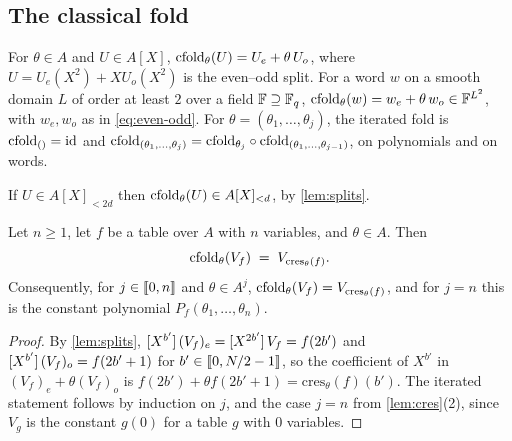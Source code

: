 \subsection{The classical fold}\label{sec:restriction:fold}

\begin{definition}\label{def:cfold}
For $\theta \in A$ and $U \in A[X]$, $\mathrm{cfold}_\theta(U) = U_e + \theta\, U_o$, where $U = U_e(X^2) + X U_o(X^2)$ is the even--odd split.
For a word $w$ on a smooth domain $L$ of order at least $2$ over a field $\mathbb{F} \supseteq \mathbb{F}_q$, $\mathrm{cfold}_\theta(w) = w_e + \theta\, w_o \in \mathbb{F}^{L^2}$, with $w_e, w_o$ as in \eqref{eq:even-odd}.
For $\theta = (\theta_1,\dots,\theta_j)$, the iterated fold is $\mathrm{cfold}_{()} = \mathrm{id}$ and $\mathrm{cfold}_{(\theta_1,\dots,\theta_j)} = \mathrm{cfold}_{\theta_j} \circ \mathrm{cfold}_{(\theta_1,\dots,\theta_{j-1})}$, on polynomials and on words.
\end{definition}

If $U \in A[X]_{<2d}$ then $\mathrm{cfold}_\theta(U) \in A[X]_{<d}$, by \cref{lem:splits}.

\begin{theorem}\label{thm:dictionary}
Let $n \ge 1$, let $f$ be a table over $A$ with $n$ variables, and $\theta \in A$. Then
\[
  \mathrm{cfold}_\theta(V_f) \;=\; V_{\mathrm{cres}_\theta(f)}.
\]
Consequently, for $j \in \llbracket 0, n \rrbracket$ and $\theta \in A^j$, $\mathrm{cfold}_\theta(V_f) = V_{\mathrm{cres}_\theta(f)}$, and for $j = n$ this is the constant polynomial $P_f(\theta_1,\dots,\theta_n)$.
\end{theorem}

\begin{proof}
By \cref{lem:splits}, $[X^{b'}]\,(V_f)_e = [X^{2b'}]\,V_f = f(2b')$ and $[X^{b'}]\,(V_f)_o = f(2b'+1)$ for $b' \in \llbracket 0, N/2-1 \rrbracket$, so the coefficient of $X^{b'}$ in $(V_f)_e + \theta (V_f)_o$ is $f(2b') + \theta f(2b'+1) = \mathrm{cres}_\theta(f)(b')$.
The iterated statement follows by induction on $j$, and the case $j = n$ from \cref{lem:cres}(2), since $V_g$ is the constant $g(0)$ for a table $g$ with $0$ variables.
\end{proof}

